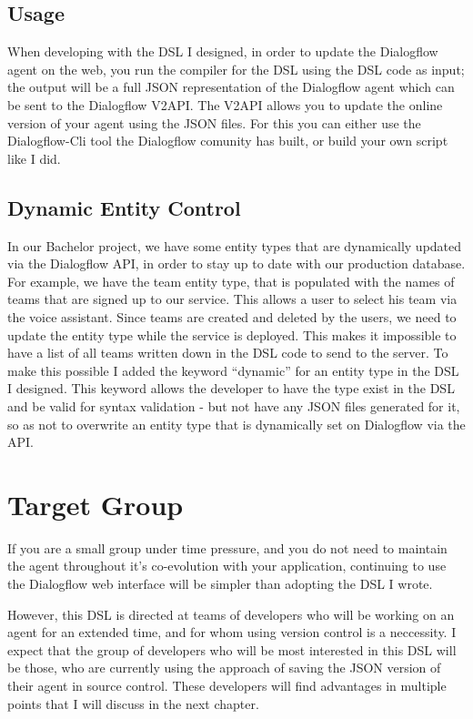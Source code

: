 \subsection{Usage}

When developing with the DSL I designed, in order to update the Dialogflow agent on the web, you run the compiler for the DSL using the DSL code as input; the output will be a full JSON representation of the Dialogflow agent which can be sent to the Dialogflow V2API.
The V2API allows you to update the online version of your agent using the JSON files. For this you can either use the Dialogflow-Cli tool \cite{Charles2018} the Dialogflow comunity has built, or build your own script like I did.

\subsection{Dynamic Entity Control}

In our Bachelor project, we have some entity types that are dynamically updated via the Dialogflow API, in order to stay up to date with our production database. For example, we have the team entity type, that is populated with the names of teams that are signed up to our service. This allows a user to select his team via the voice assistant.
Since teams are created and deleted by the users, we need to update the entity type while the service is deployed.
This makes it impossible to have a list of all teams written down in the DSL code to send to the server. 
To make this possible I added the keyword “dynamic” for an entity type in the DSL I designed.
This keyword allows the developer to have the type exist in the DSL and be valid for syntax validation - but not have any JSON files generated for it, so as not to overwrite an entity type that is dynamically set on Dialogflow via the API.

\section{Target Group}

If you are a small group under time pressure, and you do not need to maintain the agent throughout it's co-evolution with your application, continuing to use the Dialogflow web interface will be simpler than adopting the DSL I wrote.

However, this DSL is directed at teams of developers who will be working on an agent for an extended time, and for whom using version control is a neccessity.
I expect that the group of developers who will be most interested in this DSL will be those, who are currently using the approach of saving the JSON  version of their agent in source control.
These developers will find advantages in multiple points that I will discuss in the next chapter.

